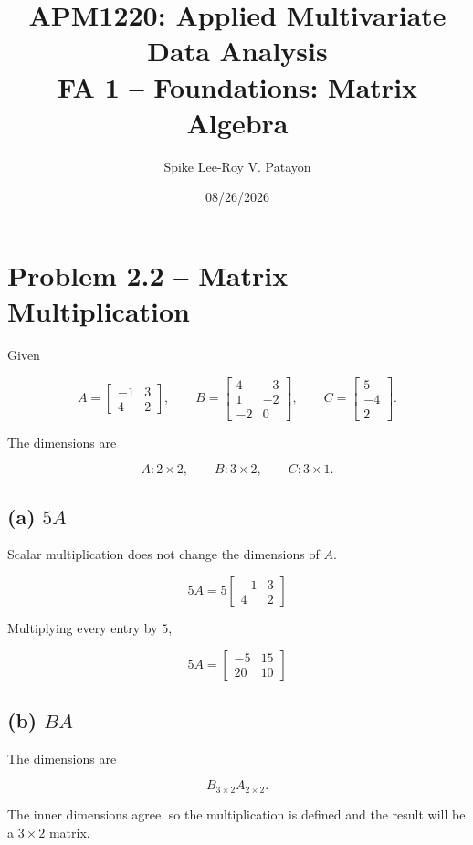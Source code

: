 \documentclass[12pt]{article}
\title{\textbf{APM1220: Applied Multivariate Data Analysis}\\
FA 1 -- Foundations: Matrix Algebra}
\author{Spike Lee-Roy V. Patayon}
\date{08/26/2026}
\begin{document}
\maketitle

\section*{Problem 2.2 -- Matrix Multiplication}

Given

\[
A=
\begin{bmatrix}
-1 & 3\\
4 & 2
\end{bmatrix},
\qquad
B=
\begin{bmatrix}
4 & -3\\
1 & -2\\
-2 & 0
\end{bmatrix},
\qquad
C=
\begin{bmatrix}
5\\
-4\\
2
\end{bmatrix}.
\]

The dimensions are

\[
A:2\times2,\qquad
B:3\times2,\qquad
C:3\times1.
\]

\subsection*{(a) $5A$}

Scalar multiplication does not change the dimensions of $A$.

\[
5A
=
5
\begin{bmatrix}
-1 & 3\\
4 & 2
\end{bmatrix}
\]

Multiplying every entry by $5$,

\[
\boxed{
5A=
\begin{bmatrix}
-5 & 15\\
20 & 10
\end{bmatrix}}
\]

\subsection*{(b) $BA$}

The dimensions are

\[
B_{3\times2}A_{2\times2}.
\]

The inner dimensions agree, so the multiplication is defined and the
result will be a $3\times2$ matrix.
\end{document}
